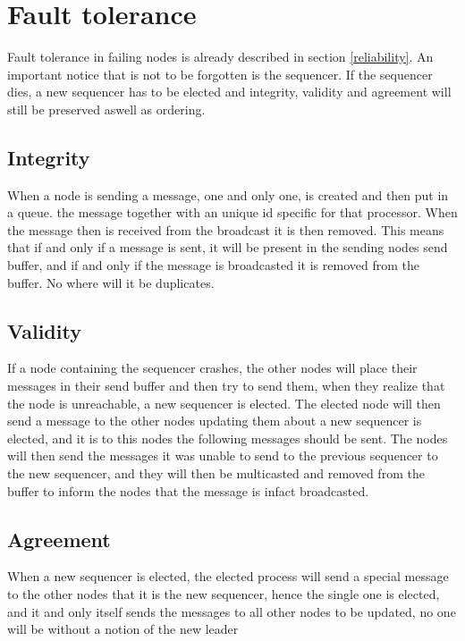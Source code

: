 \documentclass{article}
\begin{document}
\section{Fault tolerance}
  Fault tolerance in failing nodes is already described in section \ref{reliability}.
  An important notice that is not to be forgotten is the sequencer. If the sequencer 
  dies, a new sequencer has to be elected and integrity, validity and agreement will 
  still be preserved aswell as ordering.
  \subsection{Integrity}
    When a node is sending a message, one and only one, is created and then put in a queue.
    the message together with an unique id specific for that processor. When the message then is 
    received from the broadcast it is then removed. This means that if and only if a message is 
    sent, it    will be present in the sending nodes send buffer, and if and only if the message
    is broadcasted it is removed from the buffer. No where will it be duplicates.
    
  \subsection{Validity}
    If a node containing the sequencer crashes, the other nodes will place their messages in their
    send buffer and then try to send them, when they realize that the node is unreachable, a new 
    sequencer is elected. The elected node will then send a message to the other nodes updating them
    about a new sequencer is elected, and it is to this nodes the following messages should be sent.
    The nodes will then send the messages it was unable to send to the previous sequencer to the
    new sequencer, and they will then be multicasted and removed from the buffer to inform the nodes
    that the message is infact broadcasted.

  \subsection{Agreement}
    When a new sequencer is elected, the elected process will send a special message to the other nodes
    that it is the new sequencer, hence the single one is elected, and it and only itself sends the 
    messages to all other nodes to be updated, no one will be without a notion of the new leader
\end{document}
